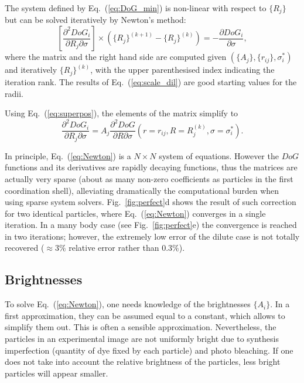 \documentclass[8.5pt,twoside,twocolumn]{article}
\begin{document}
The system defined by Eq.~(\ref{eq:DoG_min}) is non-linear with respect to $\lbrace R_j\rbrace$ but can be solved iteratively by Newton's method:
\begin{equation}
\left[ \frac{\partial^2 DoG_i}{\partial R_j\partial\sigma}\right] \times \left( \lbrace R_j\rbrace^{(k+1)} - \lbrace R_j\rbrace^{(k)} \right) = -\frac{\partial DoG_i}{\partial\sigma},
\label{eq:Newton}
\end{equation}
where the matrix and the right hand side are computed given $(\lbrace A_j\rbrace, \lbrace r_{ij}\rbrace, \sigma_i^*)$ and iteratively $\lbrace R_j\rbrace^{(k)}$, with the upper parenthesised index indicating the iteration rank. The results of Eq.~(\ref{eq:scale_dil}) are good starting values for the radii.

Using Eq.~(\ref{eq:superpos}), the elements of the matrix simplify to
\begin{equation}
\frac{\partial^2 DoG_i}{\partial R_j\partial\sigma} =  A_j \frac{\partial^2 DoG}{\partial R\partial\sigma}(r=r_{ij}, R=R_j^{(k)}, \sigma=\sigma_i^*).
\end{equation}

In principle, Eq.~(\ref{eq:Newton}) is a $N\times N$ system of equations. However the $DoG$ functions and its derivatives are rapidly decaying functions, thus the matrices are actually very sparse (about as many non-zero coefficients as particles in the first coordination shell), alleviating dramatically the computational burden when using sparse system solvers. Fig.~\ref{fig:perfect}d shows the result of such correction for two identical particles, where Eq.~(\ref{eq:Newton}) converges in a single iteration. In a many body case (see Fig.~\ref{fig:perfect}e) the convergence is reached in two iterations; however, the extremely low error of the dilute case is not totally recovered ($\approx 3\%$ relative error rather than $0.3\%$).

\subsection{Brightnesses}

To solve Eq.~(\ref{eq:Newton}), one needs knowledge of the brightnesses $\lbrace A_i\rbrace$. In a first approximation, they can be assumed equal to a constant, which allows to simplify them out. This is often a sensible approximation. Nevertheless, the particles in an experimental image are not uniformly bright due to synthesis imperfection (quantity of dye fixed by each particle) and photo bleaching. If one does not take into account the relative brightness of the particles, less bright particles will appear smaller.
\end{document}
